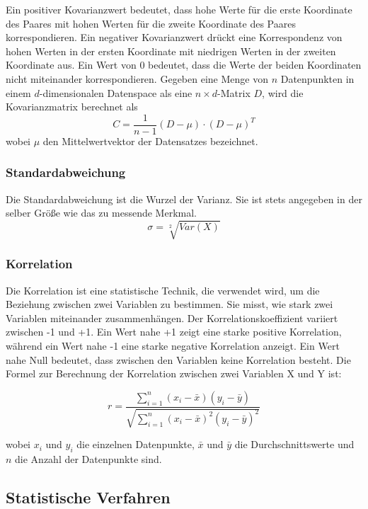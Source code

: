 \documentclass[letterpaper, titlepage]{article}
\begin{document}
Ein positiver Kovarianzwert bedeutet, dass hohe Werte für die erste Koordinate des Paares mit hohen Werten für die zweite Koordinate des Paares korrespondieren. Ein negativer Kovarianzwert drückt eine Korrespondenz von hohen Werten in der ersten Koordinate mit niedrigen Werten in der zweiten Koordinate aus. Ein Wert von $0$ bedeutet, dass die Werte der beiden Koordinaten nicht miteinander korrespondieren. Gegeben eine Menge von $n$ Datenpunkten in einem $d$-dimensionalen Datenspace als eine $n\times d$-Matrix $D$, wird die Kovarianzmatrix berechnet als $$C=\frac{1}{n-1}(D-\mu)\cdot(D-\mu)^T$$ wobei $\mu$ den Mittelwertvektor der Datensatzes bezeichnet.

\vspace{0.35cm}

\subsubsection{Standardabweichung}\label{Standardabweichung}
Die Standardabweichung ist die Wurzel der Varianz. Sie ist stets angegeben in der selber Größe wie das zu messende Merkmal.
$$\sigma = \sqrt[2]{Var(X)}$$

\vspace{0.35cm}

\subsubsection{Korrelation}\label{Korrelation}
Die Korrelation ist eine statistische Technik, die verwendet wird, um die Beziehung zwischen zwei Variablen zu bestimmen. Sie misst, wie stark zwei Variablen miteinander zusammenhängen. Der Korrelationskoeffizient variiert zwischen -1 und +1. Ein Wert nahe +1 zeigt eine starke positive Korrelation, während ein Wert nahe -1 eine starke negative Korrelation anzeigt. Ein Wert nahe Null bedeutet, dass zwischen den Variablen keine Korrelation besteht. Die Formel zur Berechnung der Korrelation zwischen zwei Variablen X und Y ist:

$$r = \frac{\sum_{i=1}^{n} (x_i - \bar{x})(y_i - \bar{y})}{\sqrt{\sum_{i=1}^{n} (x_i - \bar{x})^2(y_i - \bar{y})^2}}$$

wobei $x_i$ und $y_i$ die einzelnen Datenpunkte, $\bar{x}$ und $\bar{y}$ die Durchschnittswerte und $n$ die Anzahl der Datenpunkte sind.

\vspace{0.35cm}

\subsection{Statistische Verfahren}\label{Statistische Verfahren}
\end{document}
